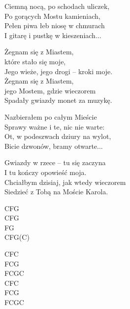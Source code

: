 \begin{text}
Ciemną nocą, po schodach uliczek,\\
Po gorących Mostu kamieniach,\\
Pełen piwa łeb niosę w chmurach\\
I gitarę i pustkę w kieszeniach...

\vin Żegnam się  z Miastem,\\
\vin które  stało się moje,\\
\vin Jego wieże, jego drogi – kroki moje.\\
\vin Żegnam się  z Miastem,\\
\vin jego Mostem, gdzie wieczorem\\
\vin Spadały gwiazdy monet za muzykę.

Nazbierałem po całym Mieście\\
Sprawy ważne i te, nic nie warte:\\
Ot, w podeszwach dziury na wylot,\\
Bicie dzwonów, bramy otwarte...

Gwiazdy w rzece – tu się zaczyna\\
I tu kończy opowieść moja.\\
Chciałbym dzisiaj, jak wtedy wieczorem\\
Siedzieć z Tobą na Moście Karola.
\end{text}
\begin{chord}
CFG\\
CFG\\
FG\\
CFG(C)

CFC\\
FCG\\
FCGC\\
CFC\\
FCG\\
FCGC
\end{chord}